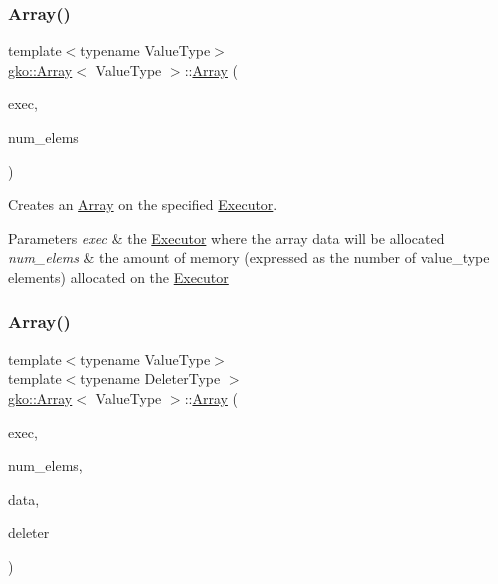 \subsubsection{\texorpdfstring{Array()}{Array()}\hspace{0.1cm}{\footnotesize\ttfamily [3/11]}}
{\footnotesize\ttfamily template$<$typename Value\+Type$>$ \\
\hyperlink{classgko_1_1Array}{gko\+::\+Array}$<$ Value\+Type $>$\+::\hyperlink{classgko_1_1Array}{Array} (\begin{DoxyParamCaption}\item[{std\+::shared\+\_\+ptr$<$ const \hyperlink{classgko_1_1Executor}{Executor} $>$}]{exec,  }\item[{\hyperlink{namespacegko_a6e5c95df0ae4e47aab2f604a22d98ee7}{size\+\_\+type}}]{num\+\_\+elems }\end{DoxyParamCaption})\hspace{0.3cm}{\ttfamily [inline]}}



Creates an \hyperlink{classgko_1_1Array}{Array} on the specified \hyperlink{classgko_1_1Executor}{Executor}. 


\begin{DoxyParams}{Parameters}
{\em exec} & the \hyperlink{classgko_1_1Executor}{Executor} where the array data will be allocated \\
\hline
{\em num\+\_\+elems} & the amount of memory (expressed as the number of {\ttfamily value\+\_\+type} elements) allocated on the \hyperlink{classgko_1_1Executor}{Executor} \\
\hline
\end{DoxyParams}
\mbox{\label{classgko_1_1Array_a4aa436a039fe6a6391b810a44d0ca9c7}} 
\subsubsection{\texorpdfstring{Array()}{Array()}\hspace{0.1cm}{\footnotesize\ttfamily [4/11]}}
{\footnotesize\ttfamily template$<$typename Value\+Type$>$ \\
template$<$typename Deleter\+Type $>$ \\
\hyperlink{classgko_1_1Array}{gko\+::\+Array}$<$ Value\+Type $>$\+::\hyperlink{classgko_1_1Array}{Array} (\begin{DoxyParamCaption}\item[{std\+::shared\+\_\+ptr$<$ const \hyperlink{classgko_1_1Executor}{Executor} $>$}]{exec,  }\item[{\hyperlink{namespacegko_a6e5c95df0ae4e47aab2f604a22d98ee7}{size\+\_\+type}}]{num\+\_\+elems,  }\item[{\hyperlink{classgko_1_1Array_ad40c95e429262175cae51bcabd291a5b}{value\+\_\+type} $\ast$}]{data,  }\item[{Deleter\+Type}]{deleter }\end{DoxyParamCaption})\hspace{0.3cm}{\ttfamily [inline]}}



